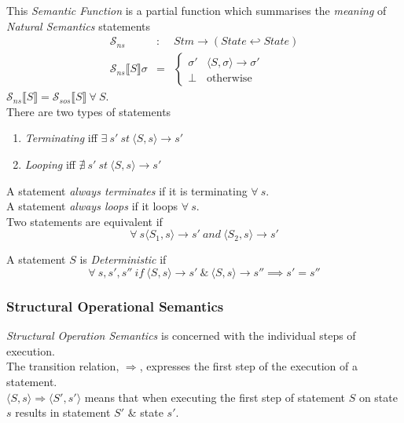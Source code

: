 \documentclass[11pt,a4paper]{article}
\begin{document}
This \textit{Semantic Function} is a partial function which summarises the \textit{meaning} of \textit{Natural Semantics} statements
\[\begin{array}{rcl}
\mathcal{S}_{ns}&:&Stm\to(State\hookleftarrow State)\\
\mathcal{S}_{ns}\llbracket  S\rrbracket\sigma&=&\begin{cases}\sigma'&\langle S,\sigma\rangle\to\sigma'\\\bot&\mathrm{otherwise}\end{cases}
\end{array}\]
\NB $\mathcal{S}_{ns}\llbracket  S\rrbracket=\mathcal{S}_{sos}\llbracket  S\rrbracket\ \forall\ S$.\\

There are two types of statements
\begin{enumerate}[label=\roman*)]
	\item \textit{Terminating} iff $\exists\ s'\ st\ \langle S,s\rangle\to s'$
	\item \textit{Looping} iff $\nexists\ s'\ st\ \langle S,s\rangle\to s'$
\end{enumerate}
A statement \textit{always terminates} if it is terminating $\forall\ s$.\\
A statement \textit{always loops} if it loops $\forall\ s$.\\

Two statements are equivalent if
$$\forall\ s \langle S_1,s\rangle\to s'\ and\ \langle S_2,s\rangle\to s'$$

A statement $S$ is \textit{Deterministic} if
$$\forall\ s,s',s''\ if\ \langle S,s\rangle\to s'\ \&\ \langle S,s\rangle\to s''\implies s'=s''$$

\subsubsection{Structural Operational Semantics}

\textit{Structural Operation Semantics} is concerned with the individual steps of execution.\\
The transition relation, $\Rightarrow$, expresses the first step of the execution of a statement.\\
$\langle S,s\rangle\Rightarrow\langle S',s'\rangle$ means that when executing the first step of statement $S$ on state $s$ results in statement $S'$ \& state $s'$.\\
\end{document}
